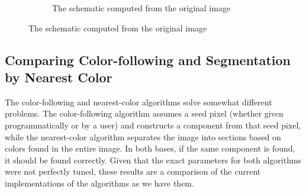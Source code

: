 \documentclass[10pt,twocolumn,letterpaper]{article}
\begin{document}
\begin{figure}[ht]
\begin{subfigure}[b]{\linewidth}
	\caption{The schematic computed from the original image}
	\label{fig:schemfull}
\end{subfigure}
\end{figure}

\subsection{Comparing Color-following and Segmentation by Nearest Color}

The color-following and nearest-color algorithms solve somewhat different
problems. The color-following algorithm assumes a seed pixel (whether given
programmatically or by a user) and constructs a component from that seed pixel,
while the nearest-color algorithm separates the image into sections based on
colors found in the entire image. In both bases, if the same component is
found, it should be found correctly. Given that the exact parameters for both
algorithms were not perfectly tuned, these results are a comparison of the
current implementations of the algorithms as we have them.
\end{document}
